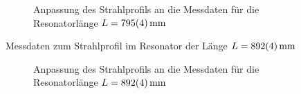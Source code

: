 \documentclass[11pt, a4paper]{article}
\numberwithin{equation}{section}
\begin{document}
\begin{appendix}
\begin{figure}[b]
	\centering
	
	\caption{Anpassung des Strahlprofils an die Messdaten für die Resonatorlänge $L = \SI{795 +- 4}{\milli\metre}$}
	\label{fig:strahlradius_80}
\end{figure}
\FloatBarrier
\begin{table}[t]
	\centering
	
	\caption{Messdaten zum Strahlprofil im Resonator der Länge $L = \SI{892 +- 4}{\milli\metre}$}
	\label{tab:strahlradius_90}
\end{table}
\begin{figure}[b]
	\centering
	
	\caption{Anpassung des Strahlprofils an die Messdaten für die Resonatorlänge $L = \SI{892 +- 4}{\milli\metre}$}
	\label{fig:strahlradius_90}
\end{figure}
\clearpage


\end{appendix}
\end{document}
